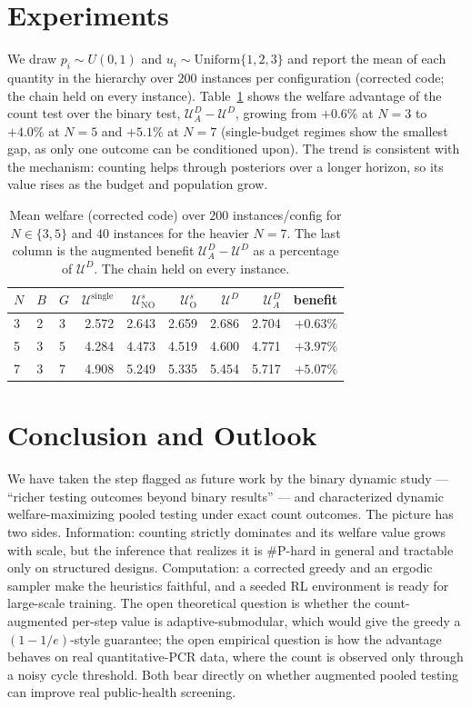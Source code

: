 \documentclass[11pt]{article}
\begin{document}
\section{Experiments}
We draw $p_i\sim U(0,1)$ and $u_i\sim\mathrm{Uniform}\{1,2,3\}$ and report the
mean of each quantity in the hierarchy over $200$ instances per configuration
(corrected code; the chain held on every instance). Table~\ref{tab:hier} shows
the welfare advantage of the count test over the binary test, $\mathcal{U}^{D}_{A}
-\mathcal{U}^{D}$, growing from $+0.6\%$ at $N{=}3$ to $+4.0\%$ at $N{=}5$ and
$+5.1\%$ at $N{=}7$ (single-budget regimes show the smallest gap, as only one
outcome can be conditioned upon). The trend is consistent with the mechanism:
counting helps through posteriors over a longer horizon, so its value rises as
the budget and population grow.

\begin{table}[t]
\centering
\caption{Mean welfare (corrected code) over $200$ instances/config for $N\in
\{3,5\}$ and $40$ instances for the heavier $N{=}7$. The last column is the
augmented benefit $\mathcal{U}^{D}_{A}-\mathcal{U}^{D}$ as a percentage of
$\mathcal{U}^{D}$. The chain held on every instance.}
\label{tab:hier}
\small
\begin{tabular}{lllrrrrrr}
\toprule
$N$ & $B$ & $G$ & $\mathcal{U}^{\mathrm{single}}$ & $\mathcal{U}^{s}_{\mathrm{NO}}$ & $\mathcal{U}^{s}_{\mathrm{O}}$ & $\mathcal{U}^{D}$ & $\mathcal{U}^{D}_{A}$ & benefit \\
\midrule
3 & 2 & 3 & 2.572 & 2.643 & 2.659 & 2.686 & 2.704 & $+0.63\%$ \\
5 & 3 & 5 & 4.284 & 4.473 & 4.519 & 4.600 & 4.771 & $+3.97\%$ \\
7 & 3 & 7 & 4.908 & 5.249 & 5.335 & 5.454 & 5.717 & $+5.07\%$ \\
\bottomrule
\end{tabular}
\end{table}

\section{Conclusion and Outlook}
We have taken the step flagged as future work by the binary dynamic study ---
``richer testing outcomes beyond binary results'' --- and characterized dynamic
welfare-maximizing pooled testing under exact count outcomes. The picture has two
sides. Information: counting strictly dominates and its welfare value grows with
scale, but the inference that realizes it is \#P-hard in general and tractable
only on structured designs. Computation: a corrected greedy and an ergodic
sampler make the heuristics faithful, and a seeded RL environment is ready for
large-scale training. The open theoretical question is whether the count-augmented
per-step value is adaptive-submodular, which would give the greedy a
$(1-1/e)$-style guarantee; the open empirical question is how the advantage
behaves on real quantitative-PCR data, where the count is observed only through a
noisy cycle threshold. Both bear directly on whether augmented pooled testing can
improve real public-health screening.
\end{document}
